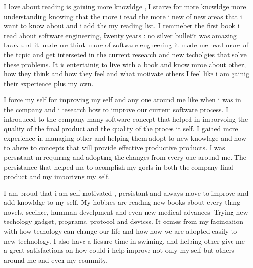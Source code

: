 \documentclass[a4paper,12pt]{article}%
\begin{document}
 
 I love about reading is gaining more knowldge , I starve for more knowldge more understanding knowing that the more i read the more i new of new areas that i want to know about and i add the my reading list. I remmeber the first book i read about software engineering, \"twenty years : no silver bullet\" it was amazing book and it made me think more of software engneering it made me read more of the topic and get interseted in the current research and new techolgies that solve these problems.   It is entertainig to live with a book and know mroe about other, how they think and how they feel and what motivate others I feel like i am gainig their experience plus my own.   
 
 I force my self for improving my self and any one around me like when i was in the company and i research how to improve our current software process. I introduced to the company many software concept that helped in imporvoing the quality of the final product and the quality of the proces it self. I gained more experience in managing other and helping them adopt to new knowldge and how to ahere to concepts that will provide effective productive products.   I was persistant in requiring and adopting the changes from every one around me. The persistance that helped me to acomplish my goals in both the company final product and my imporivng my self. 
 
 I am proud that i am self motivated  , persistant and always move to improve and add knowldge to my self. My hobbies are reading new books about every thing novels, sceince, humman develpment and even new medical advances.  Trying new techology gadget, programs, protocol and devices. It comes from my facincation with how techology can change our life and how now we are adopted easily to new technology.  I also have a liesure time in swiming, and helping other give me a great satisfactions on how could i help improve not only my self but others around me and even my coumnity.  \\
 

 
 
 
 
 
 

\end{document}

